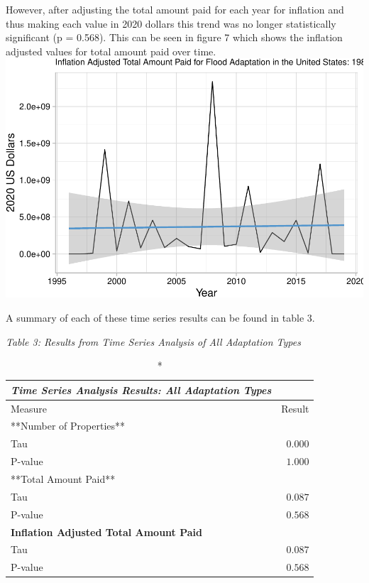 \documentclass[
  12pt,
]{article}
\begin{document}
However, after adjusting the total amount paid for each year for
inflation and thus making each value in 2020 dollars this trend was no
longer statistically significant (p = 0.568). This can be seen in figure
7 which shows the inflation adjusted values for total amount paid over
time. \newline
\includegraphics{finalreport_files/figure-latex/unnamed-chunk-11-1.pdf}

A summary of each of these time series results can be found in table 3.
\newline

\emph{Table 3: Results from Time Series Analysis of All Adaptation
Types}\\
\captionsetup[table]{labelformat=empty,skip=1pt}

\begin{longtable}{lr}
\caption*{
{\large \emph{\textbf{Time Series Analysis Results: All Adaptation Types}}}
} \\ 
\toprule
Measure & Result \\ 
\midrule
\multicolumn{1}{l}{**Number of Properties**} \\ 
\midrule
Tau & $0.000$ \\ 
P-value & $1.000$ \\ 
\midrule
\multicolumn{1}{l}{**Total Amount Paid**} \\ 
\midrule
Tau & $0.087$ \\ 
P-value & $0.568$ \\ 
\midrule
\multicolumn{1}{l}{\textbf{Inflation Adjusted Total Amount Paid}} \\ 
\midrule
Tau & $0.087$ \\ 
P-value & $0.568$ \\ 
\bottomrule
\end{longtable}
\end{document}
